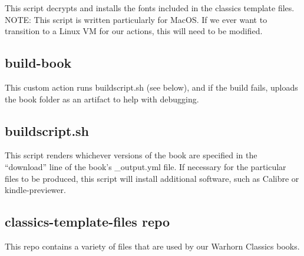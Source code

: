 \documentclass[
]{book}
\begin{document}
This script decrypts and installs the fonts included in the classics template files. NOTE: This script is written particularly for MacOS. If we ever want to transition to a Linux VM for our actions, this will need to be modified.

\hypertarget{build-book}{%
\subsection{build-book}\label{build-book}}

This custom action runs buildscript.sh (see below), and if the build fails, uploads the book folder as an artifact to help with debugging.

\hypertarget{buildscript.sh}{%
\subsection{buildscript.sh}\label{buildscript.sh}}

This script renders whichever versions of the book are specified in the ``download'' line of the book's \_output.yml file. If necessary for the particular files to be produced, this script will install additional software, such as Calibre or kindle-previewer.

\hypertarget{classics-template-files-repo}{%
\subsection{classics-template-files repo}\label{classics-template-files-repo}}

This repo contains a variety of files that are used by our Warhorn Classics books.
\end{document}
